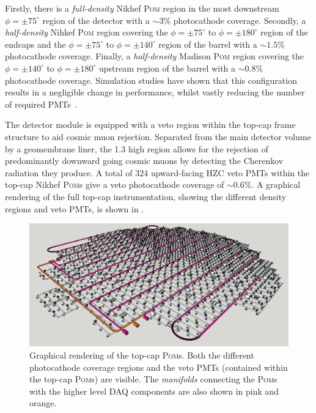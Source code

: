 Firstly, there is a \emph{full-density} Nikhef \textsc{Pom} region in the most downstream
$\phi=\pm75^{\circ}$ region of the detector with a $\sim3\%$ photocathode coverage. Secondly, a
\emph{half-density} Nihkef \textsc{Pom} region covering the $\phi=\pm75^{\circ}$ to
$\phi=\pm180^{\circ}$ region of the endcaps and the $\phi=\pm75^{\circ}$ to $\phi=\pm140^{\circ}$
region of the barrel with a $\sim1.5\%$ photocathode coverage. Finally, a \emph{half-density}
Madison \textsc{Pom} region covering the $\phi=\pm140^{\circ}$ to $\phi=\pm180^{\circ}$ upstream
region of the barrel with a $\sim0.8\%$ photocathode coverage. Simulation studies have shown that
this configuration results in a negligible change in performance, whilst vastly reducing the
number of required PMTs~\cite{blake2016}.

The \chipsfive detector module is equipped with a veto region within the top-cap frame structure
to aid cosmic muon rejection. Separated from the main detector volume by a geomembrane liner, the
\SI{1.3}{} high region allows for the rejection of predominantly downward going cosmic
muons by detecting the Cherenkov radiation they produce. A total of $324$ upward-facing HZC veto
PMTs within the top-cap Nikhef \textsc{Pom}s give a veto photocathode coverage of $\sim0.6\%$. A
graphical rendering of the full top-cap instrumentation, showing the different density regions and
veto PMTs, is shown in .

\begin{figure} %
    \includegraphics[width=\textwidth]{diagrams/4-chips/top_cap.pdf}
    \caption[Graphical rendering of the top-cap Planar Optical Modules]
    {Graphical rendering of the top-cap \textsc{Pom}s. Both the different photocathode coverage
        regions and the veto PMTs (contained within the top-cap \textsc{Pom}s) are visible. The
        \emph{manifolds} connecting the \textsc{Pom}s with the higher level DAQ components are
        also shown in pink and orange.}
    \label{fig:top_cap}
\end{figure}

